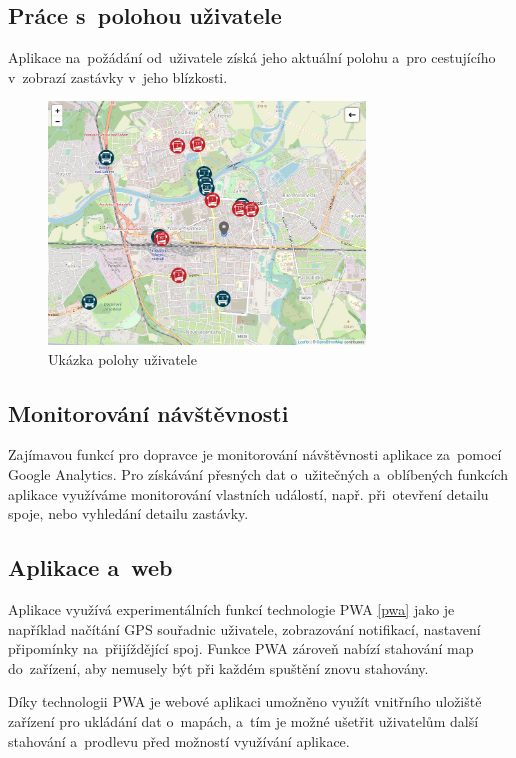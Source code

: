 \subsection{Práce s~polohou uživatele}
Aplikace na~požádání od~uživatele získá jeho aktuální polohu a~pro cestujícího v~zobrazí zastávky v~jeho blízkosti.

\begin{figure}[H]
    \centering
    \includegraphics[width=0.75\textwidth]{images/position.png}
    \caption{Ukázka polohy uživatele}
    \label{poloha}
\end{figure}
\subsection{Monitorování návštěvnosti}
Zajímavou funkcí pro dopravce je monitorování návštěvnosti aplikace za~pomocí Google Analytics. Pro získávání přesných dat o~užitečných a~oblíbených funkcích aplikace využíváme monitorování vlastních událostí, např. při~otevření detailu spoje, nebo vyhledání detailu zastávky.
\subsection{Aplikace a~web}
Aplikace využívá experimentálních funkcí technologie PWA \ref{pwa} jako je například načítání GPS souřadnic uživatele, zobrazování notifikací, nastavení připomínky na~přijíždějící spoj. Funkce PWA zároveň nabízí stahování map do~zařízení, aby nemusely být při každém spuštění znovu stahovány.

Díky technologii PWA je webové aplikaci umožněno využít vnitřního uložiště zařízení pro ukládání dat o~mapách, a~tím je možné ušetřit uživatelům další stahování a~prodlevu před možností využívání aplikace.
